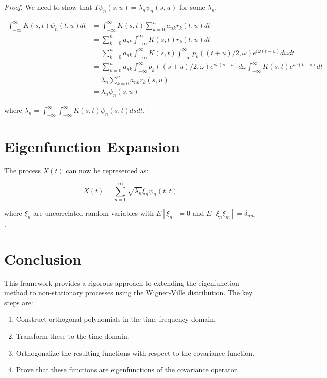 \documentclass{article}
\begin{document}
\begin{proof}
We need to show that $T\psi_n(s,u) = \lambda_n \psi_n(s,u)$ for some $\lambda_n$. 

\begin{align*}
\int_{-\infty}^{\infty} K(s,t) \psi_n(t,u) dt 
&= \int_{-\infty}^{\infty} K(s,t) \sum_{k=0}^n a_{nk} r_k(t,u) dt \\
&= \sum_{k=0}^n a_{nk} \int_{-\infty}^{\infty} K(s,t) r_k(t,u) dt \\
&= \sum_{k=0}^n a_{nk} \int_{-\infty}^{\infty} K(s,t) \int_{-\infty}^{\infty} p_k((t+u)/2, \omega) e^{i\omega(t-u)} d\omega dt \\
&= \sum_{k=0}^n a_{nk} \int_{-\infty}^{\infty} p_k((s+u)/2, \omega) e^{i\omega(s-u)} d\omega \int_{-\infty}^{\infty} K(s,t) e^{i\omega(t-s)} dt \\
&= \lambda_n \sum_{k=0}^n a_{nk} r_k(s,u) \\
&= \lambda_n \psi_n(s,u)
\end{align*}

where $\lambda_n = \int_{-\infty}^{\infty}\int_{-\infty}^{\infty} K(s,t) \psi_n(s,t) ds dt$.
\end{proof}

\section{Eigenfunction Expansion}

The process $X(t)$ can now be represented as:

\begin{equation}
X(t) = \sum_{n=0}^{\infty} \sqrt{\lambda_n} \xi_n \psi_n(t,t)
\end{equation}

where $\xi_n$ are uncorrelated random variables with $E[\xi_n] = 0$ and $E[\xi_n \xi_m] = \delta_{nm}$.

\section{Conclusion}

This framework provides a rigorous approach to extending the eigenfunction method to non-stationary processes using the Wigner-Ville distribution. The key steps are:

\begin{enumerate}
\item Construct orthogonal polynomials in the time-frequency domain.
\item Transform these to the time domain.
\item Orthogonalize the resulting functions with respect to the covariance function.
\item Prove that these functions are eigenfunctions of the covariance operator.
\end{enumerate}
\end{document}
